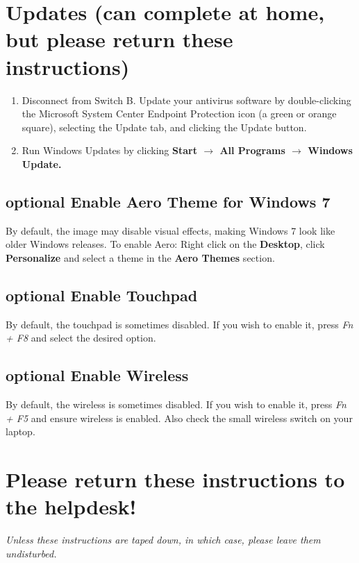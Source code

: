 \documentclass[10pt]{article}
\begin{document}
\section{Updates (can complete at home, but please return these instructions)}
\begin{enumerate}
\item Disconnect from Switch B. Update your antivirus software by double-clicking the Microsoft System Center Endpoint Protection icon (a green or orange square), selecting the Update tab, and clicking the Update button.
\item Run Windows Updates by clicking {\bf Start $\rightarrow$ All Programs $\rightarrow$ Windows Update.}
\end{enumerate}
\subsection{{\sc optional} Enable Aero Theme for Windows 7}
By default, the image may disable visual effects, making Windows 7 look like older Windows releases. To enable Aero:
Right click on the {\bf Desktop}, click {\bf Personalize} and select a theme in the {\bf Aero Themes} section.
\subsection{{\sc optional} Enable Touchpad}
By default, the touchpad is sometimes disabled. If you wish to enable it, press \emph{Fn + F8} and select the desired option.
\subsection{{\sc optional} Enable Wireless}
By default, the wireless is sometimes disabled. If you wish to enable it, press \emph{Fn + F5} and ensure wireless is enabled. Also check the small wireless switch on your laptop.
\section{Please return these instructions to the helpdesk!}
\emph{Unless these instructions are taped down, in which case, please leave them undisturbed.}
\end{document}
